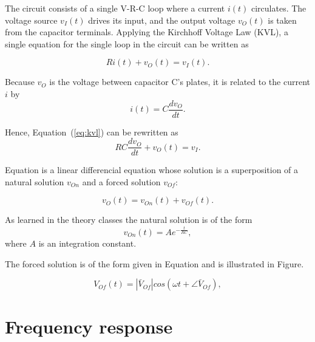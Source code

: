The circuit consists of a single V-R-C loop where a current $i(t)$ circulates. The
voltage source $v_I(t)$ drives its input, and the output voltage $v_O(t)$ is taken from
the capacitor terminals. Applying the Kirchhoff Voltage Law (KVL), a single
equation for the single loop in the circuit can be written as

\begin{equation}
  Ri(t) + v_O(t) = v_I(t).
  \label{eq:kvl}
\end{equation}

Because $v_O$ is the voltage between capacitor C's plates, it is related to the
current $i$ by
\begin{equation}
  i(t) = C\frac{dv_O}{dt}.
\end{equation}

Hence, Equation~(\ref{eq:kvl}) can be rewritten as
\begin{equation}
  RC\frac{dv_O}{dt} + v_O(t) = v_I.
  \label{eq:kvl2}
\end{equation}

Equation is a linear differencial equation whose solution is a
superposition of a natural solution $v_{On}$ and a forced solution $v_{Of}$:

\begin{equation}
  v_O(t) = v_{On}(t) + v_{Of}(t).
  \label{eq:vo_sol}
\end{equation}

As learned in the theory classes the natural solution is of the form
\begin{equation}
  v_{On}(t) = Ae^{-\frac{t}{RC}},
  \label{eq:vo_nat}
\end{equation}
where $A$ is an integration constant.

The forced solution is of the form given in Equation and is
illustrated in Figure.

\begin{equation}
  V_{Of}(t) = |\bar{V}_{Of}| cos(\omega t + \angle \bar{V}_{Of}),
  \label{eq:vo_for}
\end{equation}

\lipsum[1-1]



\section{Frequency response}

\lipsum[1-1]


